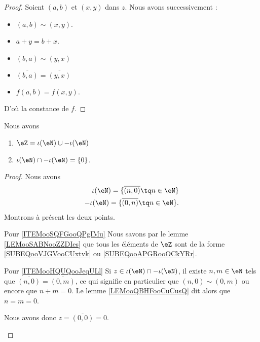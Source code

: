 \begin{proof}
    Soient \( (a,b)\) et \( (x,y)\) dans \( z\). Nous avons successivement :
    \begin{itemize}
        \item 
    \( (a,b)\sim (x,y)\). 
\item
    \( a+y=b+x\).
\item 
    \( (b,a)\sim (y,x)\)
\item
    \( \overline{ (b,a) }=\overline{ (y,x) }\)
\item
    \( f(a,b)=f(x,y)\).
    \end{itemize}
    D'où la constance de \( f\).
\end{proof}

\begin{lemma}
    Nous avons
    \begin{enumerate}
        \item       \label{ITEMooSQFGooQPgIMu}
            \( \eZ=\iota(\eN)\cup -\iota(\eN)\)
        \item       \label{ITEMooHQUQooJeqULl}
            \( \iota(\eN)\cap -\iota(\eN)=\{ 0 \}\).
    \end{enumerate}
\end{lemma}

\begin{proof}
    Nous avons
    \begin{subequations}
        \begin{align}
            \iota(\eN)=\{ \overline{ (n,0) }\tq n\in \eN \}  \label{SUBEQooVJGVooCUxtvk}\\
            -\iota(\eN)=\{ \overline{ (0,n) }\tq n\in \eN \}.   \label{SUBEQooAPGRooOCkYRr}
        \end{align}
    \end{subequations}
    Montrons à présent les deux points.
    \begin{subproof}
    \item[Pour \ref{ITEMooSQFGooQPgIMu}]
        Nous savons par le lemme \ref{LEMooSABNooZZDIes} que tous les éléments de \( \eZ\) sont de la forme \eqref{SUBEQooVJGVooCUxtvk} ou \eqref{SUBEQooAPGRooOCkYRr}.
    \item[Pour \ref{ITEMooHQUQooJeqULl}]
        Si \( z\in \iota(\eN)\cap -\iota(\eN)\), il existe \( n,m\in \eN\) tels que \( \overline{ (n,0) }=\overline{ (0,m) }\), ce qui signifie en particulier que \( (n,0)\sim(0,m)\) ou encore que \( n+m=0\). Le lemme \ref{LEMooQBHFooCuCusQ} dit alors que \( n=m=0\).

        Nous avons donc \( z= \overline{ (0,0) }=0\).
    \end{subproof}
\end{proof}

